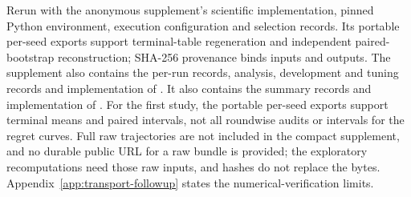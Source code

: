 Rerun  with the anonymous supplement's scientific
implementation, pinned Python environment, execution configuration and selection
records. Its portable per-seed exports support terminal-table regeneration and
independent paired-bootstrap reconstruction; SHA-256 provenance binds inputs and
outputs. The supplement also contains the per-run records, analysis, development and
tuning records and implementation of . It also contains the
summary records and implementation of . For the first
study, the portable per-seed exports support terminal means and paired
intervals, not all roundwise audits or intervals for the regret curves. Full
raw trajectories are not included in the compact supplement, and no
durable public URL for a raw bundle is provided; the exploratory
recomputations need those raw inputs, and hashes do not replace the bytes.
Appendix~\ref{app:transport-followup} states the numerical-verification limits.
